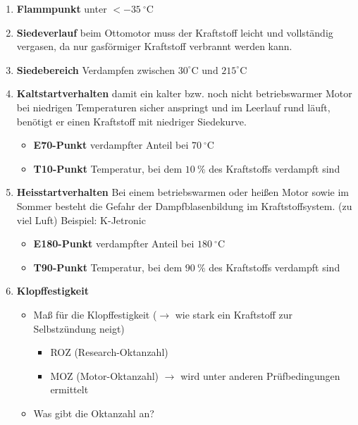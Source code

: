 \begin{enumerate}
\item
  \textbf{Flammpunkt} unter $<-35~^\circ\text{C}$
\item
  \textbf{Siedeverlauf} beim Ottomotor muss der Kraftstoff leicht und
  vollständig vergasen, da nur gasförmiger Kraftstoff verbrannt werden
  kann.
\item
  \textbf{Siedebereich} Verdampfen zwischen
  $30^\circ\text{C} \text{ und } 215^\circ\text{C}$
\item
  \textbf{Kaltstartverhalten} damit ein kalter bzw. noch nicht
  betriebswarmer Motor bei niedrigen Temperaturen sicher anspringt und
  im Leerlauf rund läuft, benötigt er einen Kraftstoff mit niedriger
  Siedekurve.

  \begin{itemize}
  \item
    \textbf{E70-Punkt} verdampfter Anteil bei $70~^\circ\text{C}$
  \item
    \textbf{T10-Punkt} Temperatur, bei dem $10~\%$ des Kraftstoffs
    verdampft sind
  \end{itemize}
\item
  \textbf{Heisstartverhalten} Bei einem betriebswarmen oder heißen Motor
  sowie im Sommer besteht die Gefahr der Dampfblasenbildung im
  Kraftstoffsystem. (zu viel Luft) Beispiel: K-Jetronic

  \begin{itemize}
  \item
    \textbf{E180-Punkt} verdampfter Anteil bei $180~^\circ\text{C}$
  \item
    \textbf{T90-Punkt} Temperatur, bei dem $90~\%$ des Kraftstoffs
    verdampft sind
  \end{itemize}
\item
  \textbf{Klopffestigkeit}

  \begin{itemize}
  \item
    Maß für die Klopffestigkeit ($\to$ wie stark ein Kraftstoff zur
    Selbstzündung neigt)

    \begin{itemize}
    \item
      ROZ (Research-Oktanzahl)
    \item
      MOZ (Motor-Oktanzahl) $\to$ wird unter anderen Prüfbedingungen
      ermittelt
    \end{itemize}
  \item
    Was gibt die Oktanzahl an?


\end{itemize}
\end{enumerate}
